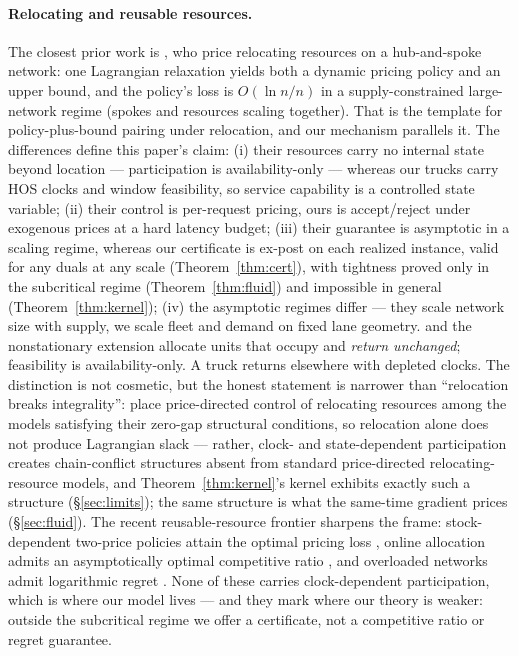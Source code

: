 \documentclass[11pt]{article}
\begin{document}
\paragraph{Relocating and reusable resources.} The closest prior
work is \citet{balseirobrownchen2021relocating}, who price relocating
resources on a hub-and-spoke network: one Lagrangian relaxation
yields both a dynamic pricing policy and an upper bound, and the
policy's loss is $O(\ln n / n)$ in a supply-constrained large-network
regime (spokes and resources scaling together). That is the template
for policy-plus-bound pairing under relocation, and our mechanism
parallels it. The differences define this paper's claim: (i) their
resources carry no internal state beyond location --- participation
is availability-only --- whereas our trucks carry HOS clocks and
window feasibility, so service capability is a controlled state
variable; (ii) their control is per-request pricing, ours is
accept/reject under exogenous prices at a hard latency budget; (iii)
their guarantee is asymptotic in a scaling regime, whereas our
certificate is ex-post on each realized instance, valid for any duals
at any scale (Theorem~\ref{thm:cert}), with tightness proved only in
the subcritical regime (Theorem~\ref{thm:fluid}) and impossible in
general (Theorem~\ref{thm:kernel}); (iv) the asymptotic regimes
differ --- they scale network size with supply, we scale fleet and
demand on fixed lane geometry. \citet{zhangcheung2022reusable}
and the nonstationary extension \citet{zhangcheung2025nonstationary}
allocate units that occupy and \emph{return unchanged}; feasibility
is availability-only. A truck returns elsewhere with depleted clocks.
The distinction is not cosmetic, but the honest statement is
narrower than ``relocation breaks integrality'':
\citet{brownzhang2023strength} place price-directed control of
relocating resources among the models satisfying their zero-gap
structural conditions, so relocation alone does not produce
Lagrangian slack --- rather, clock- and state-dependent participation
creates chain-conflict structures absent from standard
price-directed relocating-resource models, and
Theorem~\ref{thm:kernel}'s kernel exhibits exactly such a structure
(\S\ref{sec:limits}); the same structure is what the same-time
gradient prices (\S\ref{sec:fluid}). The recent reusable-resource
frontier sharpens the frame: stock-dependent two-price policies
attain the optimal pricing loss \citep{balseiromazhang2025twoprices},
online allocation admits an asymptotically optimal competitive ratio
\citep{goyaliyengarudwani2025reusable}, and overloaded networks admit
logarithmic regret \citep{xiegurvichkucukyavuz2025logregret}. None of
these carries clock-dependent participation, which is where our model
lives --- and they mark where our theory is weaker: outside the
subcritical regime we offer a certificate, not a competitive ratio or
regret guarantee.
\end{document}
